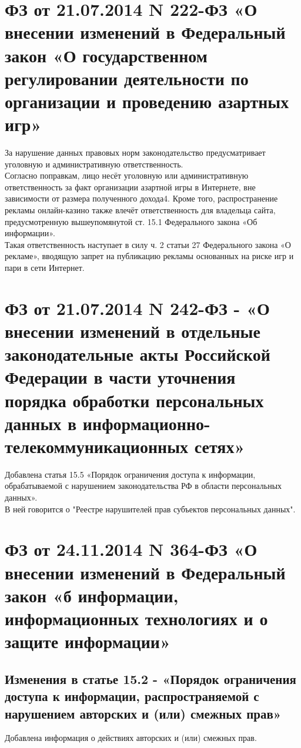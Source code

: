 \documentclass[14pt,a4paper,report]{article}
\begin{document}
\section{ФЗ от 21.07.2014 N 222-ФЗ «О внесении изменений в Федеральный закон «О государственном регулировании деятельности по организации и проведению азартных игр»}

За нарушение данных правовых норм законодательство предусматривает уголовную и административную ответственность.\\ 

Согласно поправкам, лицо несёт уголовную или административную ответственность за факт организации азартной игры в Интернете, вне зависимости от размера полученного дохода4. Кроме того, распространение рекламы онлайн-казино также влечёт ответственность для владельца сайта, предусмотренную вышеупомянутой ст. 15.1 Федерального закона «Об информации».\\ 
Такая ответственность наступает в силу ч. 2 статьи 27 Федерального закона «О рекламе», вводящую запрет на публикацию рекламы основанных на риске игр и пари в сети Интернет.


\section{ФЗ от 21.07.2014 N 242-ФЗ - «О внесении изменений в отдельные законодательные акты Российской Федерации в части уточнения порядка обработки персональных данных в информационно-телекоммуникационных сетях»}

Добавлена статья 15.5 «Порядок ограничения доступа к информации, обрабатываемой с нарушением законодательства РФ в области персональных данных».\\
В ней говорится о "Реестре нарушителей прав субъектов персональных данных".


\section{ФЗ от 24.11.2014 N 364-ФЗ «О внесении изменений в Федеральный закон «б информации, информационных технологиях и о защите информации»}

\subsection{Изменения в статье 15.2 - «Порядок ограничения доступа к информации, распространяемой с нарушением авторских и (или) смежных прав»}

Добавлена информация о действиях авторских и (или) смежных прав.
\end{document}
